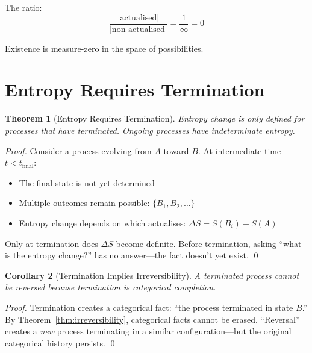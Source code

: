 \documentclass[twocolumn,10pt]{article}
\newtheorem{theorem}{Theorem}[section]
\newtheorem{corollary}[theorem]{Corollary}
\theoremstyle{definition}
\theoremstyle{remark}
\begin{document}
The ratio:
\begin{equation}
\frac{|\text{actualised}|}{|\text{non-actualised}|} = \frac{1}{\infty} = 0
\end{equation}

Existence is measure-zero in the space of possibilities.

\section{Entropy Requires Termination}
\label{sec:termination}

\begin{theorem}[Entropy Requires Termination]
\label{thm:termination}
Entropy change is only defined for processes that have terminated. Ongoing processes have indeterminate entropy.
\end{theorem}

\begin{proof}
Consider a process evolving from $A$ toward $B$. At intermediate time $t < t_{\text{final}}$:
\begin{itemize}
\item The final state is not yet determined
\item Multiple outcomes remain possible: $\{B_1, B_2, \ldots\}$
\item Entropy change depends on which actualises: $\Delta S = S(B_i) - S(A)$
\end{itemize}

Only at termination does $\Delta S$ become definite. Before termination, asking ``what is the entropy change?'' has no answer---the fact doesn't yet exist. \qed
\end{proof}

\begin{corollary}[Termination Implies Irreversibility]
A terminated process cannot be reversed because termination is categorical completion.
\end{corollary}

\begin{proof}
Termination creates a categorical fact: ``the process terminated in state $B$.'' By Theorem~\ref{thm:irreversibility}, categorical facts cannot be erased. ``Reversal'' creates a \textit{new} process terminating in a similar configuration---but the original categorical history persists. \qed
\end{proof}
\end{document}
